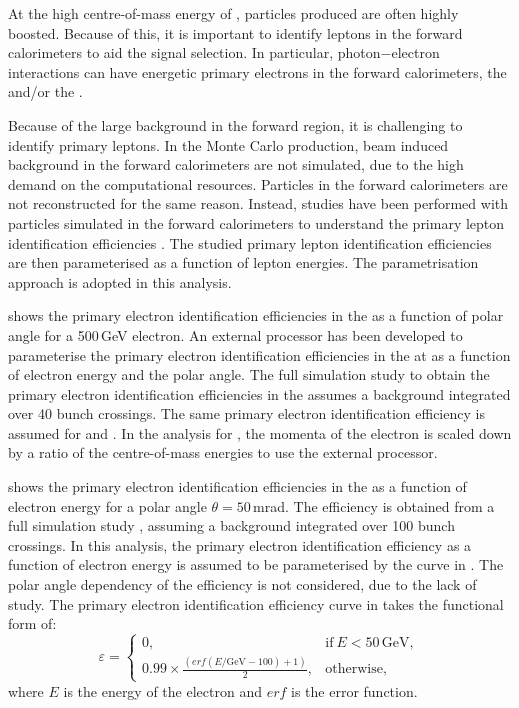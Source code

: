 At the high centre-of-mass energy of \CLIC, particles produced are often highly boosted.  Because of this, it is important to identify leptons in the forward calorimeters to aid the signal selection. In particular, photon$-$electron interactions can have energetic primary  electrons in  the forward calorimeters, the \LumiCAL and/or the \BeamCAL.

Because of the large background in the forward region, it is challenging to identify primary leptons. In the Monte Carlo production,  beam induced background in the forward calorimeters are not simulated, due to the high demand on the computational resources. Particles in  the forward calorimeters are not reconstructed for the same reason. Instead, studies have been performed with particles simulated in the forward calorimeters to understand the primary lepton identification efficiencies \cite{sailer2012radiation,Sailer:2017onh,Lukic:forwardElectron}. The studied  primary lepton identification efficiencies are then parameterised as a function of lepton energies. The parametrisation approach is adopted in this analysis.

 shows the primary electron identification efficiencies in the \BeamCAL as a function of polar angle for a 500\,GeV electron.  An external processor \cite{Sailer:2017onh} has been developed to parameterise the primary electron identification efficiencies in the \BeamCAL at  as a function of electron energy and the polar angle. The full simulation study to obtain the primary electron identification efficiencies in the \BeamCAL assumes a background integrated over 40 bunch crossings.  The same primary electron identification efficiency is assumed for  and . In the analysis for , the momenta of the electron is scaled down by a ratio of the centre-of-mass energies to use the external processor.

 shows the primary electron identification efficiencies in the \LumiCAL as a function of electron energy for a polar angle $\theta = 50$\,mrad. The efficiency is obtained from a full simulation study \cite{Lukic:forwardElectron}, assuming a background integrated over 100 bunch crossings. In this analysis, the primary electron identification efficiency  as a function of electron energy is assumed to be parameterised by the curve in . The polar angle dependency of the efficiency is not considered, due to the lack of study. The primary electron identification efficiency curve in  takes the functional form of:
\begin{equation}
\varepsilon=
\begin{cases}
  0, & \text{if}\ E < 50\,\text{GeV},\\
  0.99 \times \frac{(erf(E / \text{GeV} - 100) + 1 )}{2}, & \text{otherwise},
\end{cases}
\end{equation}
where $E$ is the energy of the electron and $erf$ is the error function.

